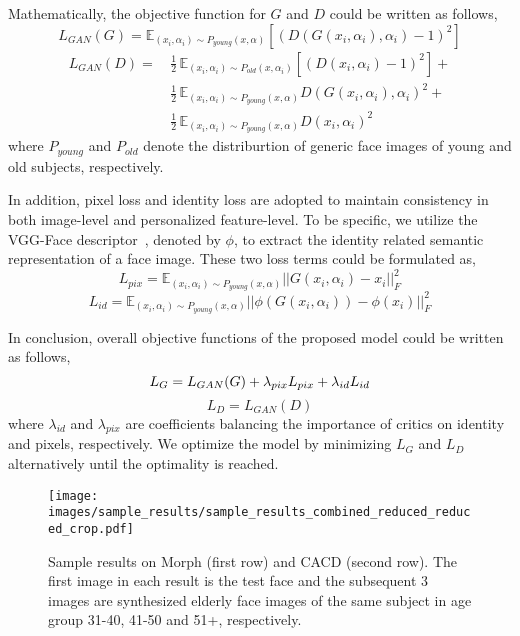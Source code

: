 \documentclass[letterpaper]{article} %
\begin{document}
Mathematically, the objective function for $G$ and $D$ could be written as follows,
\begin{equation}
L_{GAN}(G)=\mathbb{E}_{(x_i, \alpha_i)\sim P_{young}(x, \alpha)}[(D(G(x_i, \alpha_i), \alpha_i)-1)^2]
\end{equation}
\begin{equation}
\begin{split}
L_{GAN}(D)=&\,\frac{1}{2}\,\mathbb{E}_{(x_i, \alpha_i)\sim P_{old}(x, \alpha_i)}[(D(x_i, \alpha_i)-1)^2]+\\
      &\,\frac{1}{2}\,\mathbb{E}_{(x_i, \alpha_i)\sim P_{young}(x, \alpha)}D(G(x_i, \alpha_i), \alpha_i)^2+\\
      &\,\frac{1}{2}\,\mathbb{E}_{(x_i, \alpha_i)\sim P_{young}(x, \alpha)}D(x_i, \alpha_i)^2
\end{split}
\end{equation}
where $P_{young}$ and $P_{old}$ denote the distriburtion of generic face images of young and old subjects, respectively. 

In addition, pixel loss and identity loss are adopted to maintain consistency in both image-level and personalized feature-level. 
To be specific, we utilize the VGG-Face descriptor~\cite{parkhi2015deep}, denoted by $\phi$, to extract the identity related semantic representation of a face image. These two loss terms could be formulated as,
\begin{equation}
L_{pix}=\mathbb{E}_{(x_i, \alpha_i)\sim P_{young}(x, \alpha)}||G(x_i, \alpha_i)-x_i||_F^2
\end{equation}
\begin{equation}
L_{id}=\mathbb{E}_{(x_i, \alpha_i)\sim P_{young}(x, \alpha)}||\phi(G(x_i, \alpha_i))-\phi(x_i)||_F^2
\end{equation}

In conclusion, overall objective functions of the proposed model could be written as follows,
\begin{equation}
L_G=L_{GAN}(G)+\lambda_{pix}L_{pix}+\lambda_{id}L_{id} \\
\end{equation}
\begin{equation}
L_D=L_{GAN}(D)
\end{equation}
where $\lambda_{id}$ and $\lambda_{pix}$ are coefficients balancing the importance of critics on identity and pixels, respectively. We optimize the model by minimizing $L_G$ and $L_D$ alternatively  until the optimality is reached.

\begin{figure*}[ht]
\centering\texttt{[image: images/sample\_results/sample\_results\_combined\_reduced\_reduced\_crop.pdf]}
\caption{Sample results on Morph (first row) and CACD (second row). The first image in each result is the test face and the subsequent 3 images are synthesized elderly face images of the same subject in age group 31-40, 41-50 and 51+, respectively.}
\label{fig:sampleResults}
\end{figure*}
\end{document}
